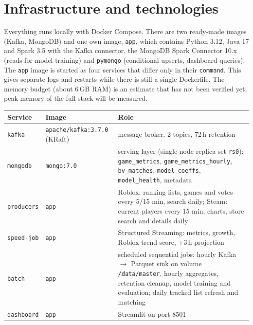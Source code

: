 \documentclass[10pt,a4paper]{article}
\newcommand{\ep}[1]{\texttt{\small #1}}
\begin{document}
\section{Infrastructure and technologies}
Everything runs locally with Docker Compose. There are two ready-made images (Kafka, MongoDB) and one own image, \ep{app}, which contains Python 3.12, Java 17 and Spark 3.5 with the Kafka connector, the MongoDB Spark Connector 10.x (reads for model training) and \ep{pymongo} (conditional upserts, dashboard queries). The \ep{app} image is started as four services that differ only in their \ep{command}. This gives separate logs and restarts while there is still a single Dockerfile. The memory budget (about 6\,GB RAM) is an estimate that has not been verified yet; peak memory of the full stack will be measured.
\begin{table}[H]
\centering\small
\begin{tabularx}{\textwidth}{L{3.0cm} L{3.4cm} Y}
\toprule
\textbf{Service} & \textbf{Image} & \textbf{Role}\\
\midrule
\ep{kafka} & \ep{apache/kafka:3.7.0} (KRaft) & message broker, 2 topics, 72\,h retention\\
\ep{mongodb} & \ep{mongo:7.0} & serving layer (single-node replica set \ep{rs0}): \ep{game\_metrics}, \ep{game\_metrics\_hourly}, \ep{bv\_matches}, \ep{model\_coeffs}, \ep{model\_health}, metadata\\
\ep{producers} & \ep{app} & Roblox: ranking lists, games and votes every 5/15 min, search daily; Steam: current players every 15 min, charts, store search and details daily\\
\ep{speed-job} & \ep{app} & Structured Streaming: metrics, growth, Roblox trend score, +3\,h projection\\
\ep{batch} & \ep{app} & scheduled sequential jobs: hourly Kafka $\rightarrow$ Parquet sink on volume \ep{/data/master}, hourly aggregates, retention cleanup, model training and evaluation; daily tracked list refresh and matching\\
\ep{dashboard} & \ep{app} & Streamlit on port 8501\\
\bottomrule
\end{tabularx}
\end{table}
\end{document}
